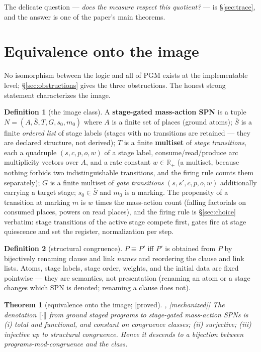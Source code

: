 \documentclass[11pt]{article}
\newcommand{\sem}[1]{\llbracket #1 \rrbracket}
\newcommand{\R}{\mathbb{R}}
\newcommand{\Rpos}{\R_{+}}
\newcommand{\stproved}{[\textsf{proved}]}
\newcommand{\stmech}{[\textsf{mechanized}]}
\theoremstyle{plain}
\newtheorem{theorem}{Theorem}
\theoremstyle{definition}
\newtheorem*{definition}{Definition}
\theoremstyle{remark}
\begin{document}
The delicate question --- \emph{does the measure respect this
quotient?} --- is \S\ref{sec:trace}, and the answer is one of the
paper's main theorems.

\section{Equivalence onto the image}\label{sec:image}

No isomorphism between the logic and all of PGM exists at the
implementable level; \S\ref{sec:obstructions} gives the three
obstructions. The honest strong statement characterizes the image.

\begin{definition}[the image class]
A \textbf{stage-gated mass-action SPN} is a tuple
$N = (A, \bar S, T, G, s_0, m_0)$ where $A$ is a finite set of places
(ground atoms); $\bar S$ is a finite \emph{ordered list} of stage labels
(stages with no transitions are retained --- they are declared
structure, not derived); $T$ is a finite \textbf{multiset} of
\emph{stage transitions}, each a quadruple $(s, c, p, o, w)$ of a stage
label, consume/read/produce arc multiplicity vectors over $A$, and a
rate constant $w \in \Rpos$ (a multiset, because nothing forbids two
indistinguishable transitions, and the firing rule counts them
separately); $G$ is a finite multiset of \emph{gate transitions}
$(s, s', c, p, o, w)$ additionally carrying a target stage;
$s_0 \in \bar S$ and $m_0$ is a marking. The propensity of a transition
at marking $m$ is $w$ times the mass-action count (falling factorials on
consumed places, powers on read places), and the firing rule is
\S\ref{sec:choice} verbatim: stage transitions of the active stage
compete first, gates fire at stage quiescence and set the register,
normalization per step.
\end{definition}

\begin{definition}[structural congruence]
$P \equiv P'$ iff $P'$ is obtained from $P$ by bijectively renaming
clause and link \emph{names} and reordering the clause and link lists.
Atoms, stage labels, stage order, weights, and the initial data are
fixed pointwise --- they are semantics, not presentation (renaming an
atom or a stage changes which SPN is denoted; renaming a clause does
not).
\end{definition}

\begin{theorem}[equivalence onto the image; \stproved{}, \stmech{}]
\label{thm:image}
The denotation $\sem{\cdot}$ from ground staged programs to stage-gated
mass-action SPNs is (i) total and functional, and constant on
congruence classes; (ii) surjective; (iii) injective up to structural
congruence. Hence it descends to a bijection between
programs-mod-congruence and the class.
\end{theorem}
\end{document}
